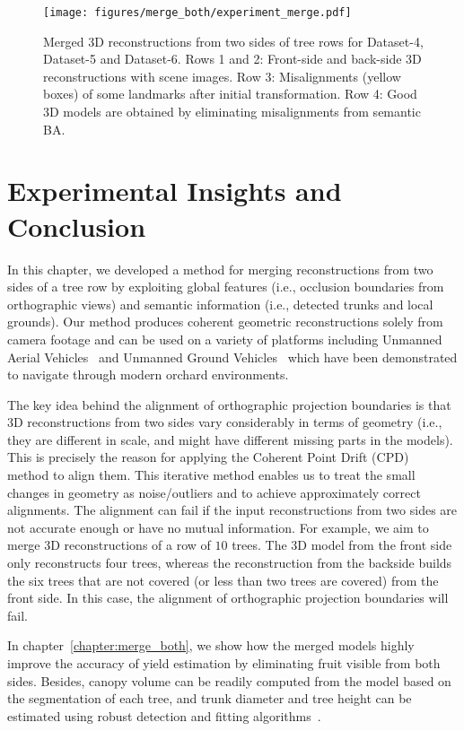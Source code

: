 \begin{figure}[!hbpt]
    \centering
    \texttt{[image: figures/merge\_both/experiment\_merge.pdf]}
    \caption[Merged 3D reconstructions for RGB-D datasets.]{Merged 3D reconstructions from two sides of tree rows for Dataset-4, Dataset-5 and Dataset-6. Rows 1 and 2: Front-side and back-side 3D reconstructions with scene images. Row 3: Misalignments (yellow boxes) of some landmarks after initial transformation. Row 4: Good 3D models are obtained by eliminating misalignments from semantic BA.}
    \label{fig:Canopy_Test}
\end{figure}



\section{Experimental Insights and Conclusion}

In this chapter, we developed a method for merging reconstructions from two sides of a tree row by exploiting global features (i.e., occlusion boundaries from orthographic views) and semantic information (i.e., detected trunks and local grounds). Our method produces coherent geometric reconstructions solely from camera footage and can be used on a variety of platforms including Unmanned Aerial Vehicles~\cite{techreportroy} and Unmanned Ground Vehicles~\cite{peng2016semantic} which have been demonstrated to navigate through modern orchard environments.

The key idea behind the alignment of orthographic projection boundaries is that 3D reconstructions from two sides vary considerably in terms of geometry (i.e., they are different in scale, and might have different missing parts in the models). This is precisely the reason for applying the Coherent Point Drift (CPD)~\cite{myronenko2010point} method to align them. This iterative method enables us to treat the small changes in geometry as noise/outliers and to achieve approximately correct alignments. The alignment can fail if the input reconstructions from two sides are not accurate enough or have no mutual information. For example, we aim to merge 3D reconstructions of a row of $10$ trees. The 3D model from the front side only reconstructs four trees, whereas the reconstruction from the backside builds the six trees that are not covered (or less than two trees are covered) from the front side. In this case, the alignment of orthographic projection boundaries will fail.


In chapter~\ref{chapter:merge_both}, we show how the merged models highly improve the accuracy of yield estimation by eliminating fruit visible from both sides. Besides, canopy volume can be readily computed from the model based on the segmentation of each tree, and trunk diameter and tree height can be estimated using robust detection and fitting algorithms~\cite{dong2018semantic}. 